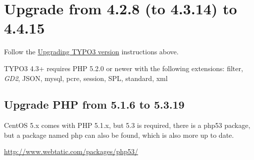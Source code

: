 \documentclass[a4paper,11pt,english]{sphinxmanual}
\begin{document}
\section{Upgrade from 4.2.8 (to 4.3.14) to 4.4.15}
\label{typo3:upgrade-from-4-2-8-to-4-3-14-to-4-4-15}
Follow the {\hyperref[typo3:upgrading-typo3-version]{Upgrading TYPO3 version}} instructions above.

TYPO3 4.3+ requires PHP 5.2.0 or newer with the following extensions:
filter, \emph{GD2}, JSON, mysql, pcre, session, SPL, standard, xml


\subsection{Upgrade PHP from 5.1.6 to 5.3.19}
\label{typo3:upgrade-php-from-5-1-6-to-5-3-19}
CentOS 5.x comes with PHP 5.1.x, but 5.3 is required, there is a php53 package,
but a package named php can also be found, which is also more up to date.

\href{http://www.webtatic.com/packages/php53/}{http://www.webtatic.com/packages/php53/}
\end{document}
